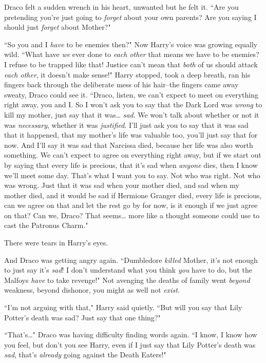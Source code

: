 Draco felt a sudden wrench in his heart, unwanted but he felt it. ``Are you pretending you're just going to \emph{forget} about your own parents? Are you saying I should just \emph{forget} about Mother?"

``So you and I \emph{have} to be enemies then?" Now Harry's voice was growing equally wild. ``What have \emph{we} ever done to \emph{each other} that means we have to be enemies? I refuse to be trapped like that! Justice can't mean that \emph{both} of us should attack \emph{each other}, it doesn't make sense!" Harry stopped, took a deep breath, ran his fingers back through the deliberate mess of his hair\---the fingers came away sweaty, Draco could see it. ``Draco, listen, we can't expect to meet on everything right away, you and I\@. So I won't ask you to say that the Dark Lord was \emph{wrong} to kill my mother, just say that it was{\ldots} \emph{sad}. We won't talk about whether or not it was \emph{necessary}, whether it was \emph{justified}. I'll just ask you to say that it was sad that it happened, that my mother's life was valuable too, you'll just say that for now. And I'll say it was sad that Narcissa died, because her life was also worth something. We can't expect to agree on everything right away, but if we start out by saying that every life is precious, that it's sad when \emph{anyone} dies, then I know we'll meet some day. That's what I want you to say. Not who was right. Not who was wrong. Just that it was sad when your mother died, and sad when my mother died, and it would be sad if Hermione Granger died, every life is precious, can we agree on that and let the rest go by for now, is it enough if we just agree on that? Can we, Draco? That seems{\ldots} more like a thought someone could use to cast the Patronus Charm."

There were tears in Harry's eyes.

And Draco was getting angry again. ``Dumbledore \emph{killed} Mother, it's not enough to just say it's \emph{sad}! I don't understand what you think \emph{you} have to do, but the Malfoys \emph{have} to take revenge!" Not avenging the deaths of family went \emph{beyond} weakness, beyond dishonor, you might as well not \emph{exist}.

``I'm not arguing with that," Harry said quietly. ``But will you say that Lily Potter's death was sad? Just say that one thing?"

``That's{\ldots}" Draco was having difficulty finding words again. ``I know, I know how you feel, but don't you see Harry, even if I just say that Lily Potter's death was \emph{sad}, that's \emph{already} going against the Death Eaters!"

